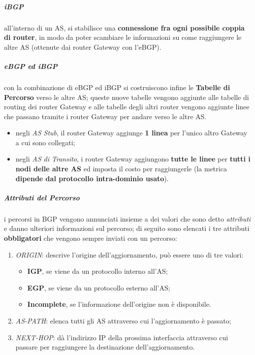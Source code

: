 \documentclass[a4paper]{article}
\begin{document}
				\subparagraph{iBGP}
					all'interno di un AS, si stabilisce una \textbf{connessione fra ogni possibile coppia di router}, in modo da poter scambiare le informazioni su come raggiungere le altre AS (ottenute dai router Gateway con l'eBGP).
					
				\subparagraph{eBGP ed iBGP}
					con la combinazione di eBGP ed iBGP si costruiscono infine le \textbf{Tabelle di Percorso} verso le altre AS; queste nuove tabelle vengono aggiunte alle tabelle di routing dei router Gateway e alle tabelle degli altri router vengono aggiunte linee che passano tramite i router Gateway per andare verso le altre AS.
					\begin{itemize}
						\item negli \emph{AS Stub}, il router Gateway aggiunge \textbf{1 linea} per l'unico altro Gateway a cui sono collegati;
						\item negli \emph{AS di Transito}, i router Gateway aggiungono \textbf{tutte le linee} per \textbf{tutti i nodi delle altre AS} ed imposta il costo per raggiungerle (la metrica \textbf{dipende dal protocollo intra-dominio usato}).
					\end{itemize}
					
				\subparagraph{Attributi del Percorso}
					i percorsi in BGP vengono annunciati insieme a dei valori che sono detto \emph{attributi} e danno ulteriori informazioni sul percorso; di seguito sono elencati i tre attributi \textbf{obbligatori} che vengono sempre inviati con un percorso:
					\begin{enumerate}
						\item \emph{ORIGIN}: descrive l'origine dell'aggiornamento, può essere uno di tre valori:
						\begin{itemize}
							\item \textbf{IGP}, se viene da un protocollo interno all'AS;
							\item \textbf{EGP}, se viene da un protocollo esterno all'AS;
							\item \textbf{Incomplete}, se l'informazione dell'origine non è disponibile.
						\end{itemize}
						\item \emph{AS-PATH}: elenca tutti gli AS attraverso cui l'aggiornamento è passato;
						\item \emph{NEXT-HOP}: dà l'indirizzo IP della prossima interfaccia attraverso cui passare per raggiungere la destinazione dell'aggiornamento.
					\end{enumerate}
					
\end{document}
